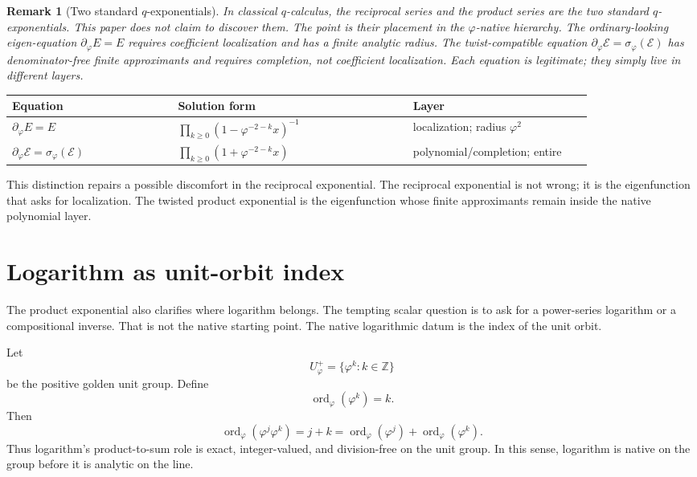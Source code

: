 \documentclass[11pt]{article}
\newtheorem{remark}[definition]{Remark}
\newcommand{\sig}{\sigma}
\newcommand{\ph}{\varphi}
\newcommand{\Z}{\mathbb{Z}}
\newcommand{\dd}{\partial_{\ph}}
\newcommand{\ord}{\operatorname{ord}}
\begin{document}
\begin{remark}[Two standard $q$-exponentials]
In classical $q$-calculus, the reciprocal series and the product series are the two standard $q$-exponentials.  This paper does not claim to discover them.  The point is their placement in the $\ph$-native hierarchy.  The ordinary-looking eigen-equation $\dd E=E$ requires coefficient localization and has a finite analytic radius.  The twist-compatible equation $\dd\mathcal E=\sig_{\ph}(\mathcal E)$ has denominator-free finite approximants and requires completion, not coefficient localization.  Each equation is legitimate; they simply live in different layers.
\end{remark}

\begin{center}
\small
\begin{tabular}{p{0.24\linewidth}p{0.34\linewidth}p{0.26\linewidth}}
\toprule
Equation & Solution form & Layer \\
\midrule
$\dd E=E$ & $\displaystyle\prod_{k\ge0}(1-\ph^{-2-k}x)^{-1}$ & localization; radius $\ph^2$ \\
$\dd\mathcal E=\sig_{\ph}(\mathcal E)$ & $\displaystyle\prod_{k\ge0}(1+\ph^{-2-k}x)$ & polynomial/completion; entire \\
\bottomrule
\end{tabular}
\end{center}

This distinction repairs a possible discomfort in the reciprocal exponential.  The reciprocal exponential is not wrong; it is the eigenfunction that asks for localization.  The twisted product exponential is the eigenfunction whose finite approximants remain inside the native polynomial layer.

\section{Logarithm as unit-orbit index}

The product exponential also clarifies where logarithm belongs.  The tempting scalar question is to ask for a power-series logarithm or a compositional inverse.  That is not the native starting point.  The native logarithmic datum is the index of the unit orbit.

Let
\[
    U_{\ph}^{+}=\{\ph^k:k\in\Z\}
\]
be the positive golden unit group.  Define
\[
    \ord_{\ph}(\ph^k)=k.
\]
Then
\[
    \ord_{\ph}(\ph^j\ph^k)=j+k
    =\ord_{\ph}(\ph^j)+\ord_{\ph}(\ph^k).
\]
Thus logarithm's product-to-sum role is exact, integer-valued, and division-free on the unit group.  In this sense, logarithm is native on the group before it is analytic on the line.
\end{document}
